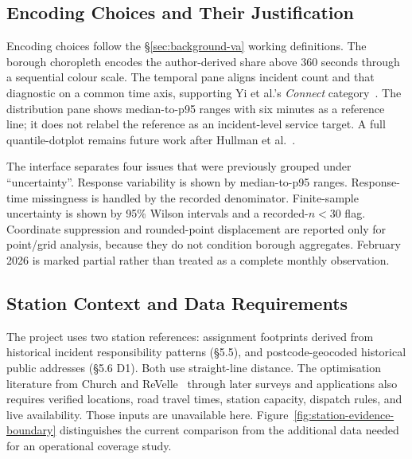 \subsection{Encoding Choices and Their Justification}

Encoding choices follow the \S\ref{sec:background-va} working definitions. The borough choropleth encodes the author-derived share above 360 seconds through a sequential colour scale. The temporal pane aligns incident count and that diagnostic on a common time axis, supporting Yi et al.'s \emph{Connect} category~\cite{yi2007}. The distribution pane shows median-to-p95 ranges with six minutes as a reference line; it does not relabel the reference as an incident-level service target. A full quantile-dotplot remains future work after Hullman et al.~\cite{hullman2015hops}.

The interface separates four issues that were previously grouped under ``uncertainty''. Response variability is shown by median-to-p95 ranges. Response-time missingness is handled by the recorded denominator. Finite-sample uncertainty is shown by 95\% Wilson intervals and a recorded-$n<30$ flag. Coordinate suppression and rounded-point displacement are reported only for point/grid analysis, because they do not condition borough aggregates. February 2026 is marked partial rather than treated as a complete monthly observation.

\subsection{Station Context and Data Requirements}

The project uses two station references: assignment footprints derived from historical incident responsibility patterns (\S5.5), and postcode-geocoded historical public addresses (\S5.6 D1). Both use straight-line distance. The optimisation literature from Church and ReVelle~\cite{church1974} through later surveys and applications \cite{goldberg2004, reconfig2023, beijing2021, ocmola2018} also requires verified locations, road travel times, station capacity, dispatch rules, and live availability. Those inputs are unavailable here. Figure~\ref{fig:station-evidence-boundary} distinguishes the current comparison from the additional data needed for an operational coverage study.

